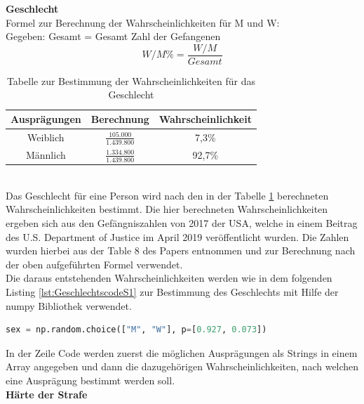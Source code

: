 \begin{onehalfspace}
\textbf{Geschlecht}\\
Formel zur Berechnung der Wahrscheinlichkeiten für \ac{M} und \ac{W}:\\
Gegeben: Gesamt = Gesamt Zahl der Gefangenen\\
\begin{equation}
    W/M\% = \frac{W/M}{Gesamt}\label{eq:Sz1Mänlich}
\end{equation}
\begin{table}[!h]
    \centering
    \begin{tabular}{|c|c|c|}
    \hline
    \textbf{Ausprägungen} & \textbf{Berechnung} & \textbf{Wahrscheinlichkeit} \\ \hline
    Weiblich              &\rule{0pt}{18pt} $\frac{105.000}{1.439.800}$  & 7,3\% \\[8pt] \hline
    Männlich              & \rule{0pt}{18pt}$\frac{1.334.800}{1.439.800}$     & 92,7\%  \\[8pt] \hline
    \end{tabular}
\caption{Tabelle zur Bestimmung der Wahrscheinlichkeiten für das Geschlecht}
\label{table:3}
\end{table}\\
Das Geschlecht für eine Person wird nach den in der Tabelle \ref{table:3} berechneten Wahrscheinlichkeiten bestimmt. Die hier berechneten Wahrscheinlichkeiten ergeben sich aus den Gefängniszahlen von 2017 der USA, welche in einem Beitrag des U.S. Department of Justice im April 2019 veröffentlicht wurden. Die Zahlen wurden hierbei aus der \glqq{}Table 8\grqq{} des Papers entnommen und zur Berechnung nach der oben aufgeführten Formel verwendet.\cite[S. 17]{Bronson2017}\\
Die daraus entstehenden Wahrscheinlichkeiten werden wie in dem folgenden Listing \ref{lst:GeschlechtscodeS1} zur Bestimmung des Geschlechts mit Hilfe der \glqq{}numpy\grqq{} Bibliothek verwendet.\\
\begin{lstlisting}[language=Python,label={lst:GeschlechtscodeS1},caption=Codezeile zur Bestimmung des Geschlechts einer Person nach angegebenen Wahrscheinlichkeiten]
sex = np.random.choice(["M", "W"], p=[0.927, 0.073])
\end{lstlisting}
In der Zeile Code werden zuerst die möglichen Ausprägungen als Strings in einem Array angegeben und dann die dazugehörigen Wahrscheinlichkeiten, nach welchen eine Ausprägung bestimmt werden soll.\\
\textbf{Härte der Strafe}\\

\end{onehalfspace}
